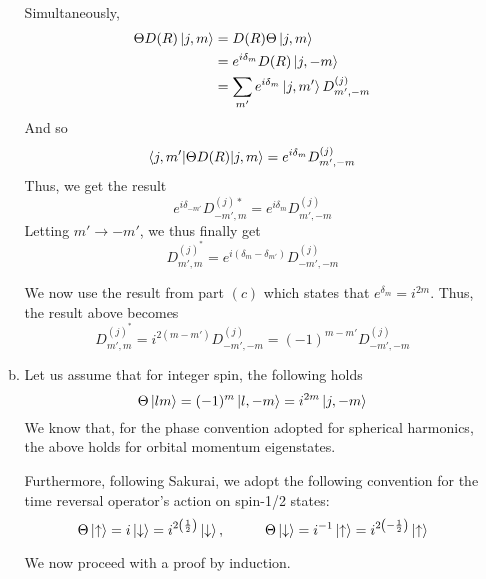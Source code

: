 \documentclass[12pt, letterpaper]{article}
\begin{document}
\begin{enumerate}
\begin{enumerate}[(a)]
        Simultaneously,
        \begin{align}
            \Theta D(R)\ket{j,m}&=D(R)\Theta \ket{j,m}\\&=e^{i\delta_m} D(R)\ket{j,-m}\\&=\sum_{m'}e^{i\delta_m}\ket{j,m'}D^{(j)}_{m',-m}
        \end{align}
        And so
        \begin{equation}
            \braket{j,m'|\Theta D(R)|j,m}=e^{i\delta_m}D^{(j)}_{m',-m}
        \end{equation}
        Thus, we get the result
        \begin{equation}
            e^{i\delta_{-m'}}D^{(j)*}_{-m',m}=e^{i\delta_m}D^{(j)}_{m',-m}
        \end{equation}
        Letting $m'\to -m'$, we thus finally get
        \begin{equation}
            D^{(j)^*}_{m',m}=e^{i(\delta_m-\delta_{m'})}D^{(j)}_{-m',-m}
        \end{equation}
        
        We now use the result from part $(c)$ which states that $e^{\delta_m}=i^{2m}$. Thus, the result above becomes
                \begin{equation}
            D^{(j)^*}_{m',m}=i^{2(m-m')}D^{(j)}_{-m',-m}=(-1)^{m-m'}D^{(j)}_{-m',-m}
        \end{equation}
        \item 
        Let us assume that for integer spin, the following holds
        \begin{equation}
            \Theta\ket{lm}=(-1)^m\ket{l,-m}=i^{2m}\ket{j,-m}
        \end{equation}
        We know that, for the phase convention adopted for spherical harmonics, the above holds for orbital momentum eigenstates. 
        
        Furthermore, following Sakurai, we adopt the following convention for the time reversal operator's action on spin-1/2 states:
        \begin{equation}
            \Theta\ket{\uparrow}=i\ket{\downarrow}=i^{2\left(\frac{1}{2}\right)}\ket{\downarrow},\hspace{1cm}\Theta\ket{\downarrow}=i^{-1}\ket{\uparrow}=i^{2\left(-\frac{1}{2}\right)}\ket{\uparrow}
        \end{equation}
        
        We now proceed with a proof by induction. 
        

\end{enumerate}
\end{enumerate}
\end{document}
